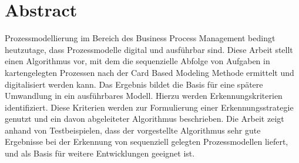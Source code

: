 

\chapter*{Abstract}
\label{cha:abstract}

Prozessmodellierung im Bereich des Business Process Management bedingt heutzutage, dass Prozessmodelle digital und ausführbar sind. Diese Arbeit stellt einen Algorithmus vor, mit dem die sequenzielle Abfolge von Aufgaben in kartengelegten Prozessen nach der Card Based Modeling Methode ermittelt und digitalisiert werden kann. Das Ergebnis bildet die Basis für eine spätere Umwandlung in ein ausführbares Modell. Hierzu werden Erkennungskriterien identifiziert. Diese Kriterien werden zur Formulierung einer Erkennungsstrategie genutzt und ein davon abgeleiteter Algorithmus beschrieben. Die Arbeit zeigt anhand von Testbeispielen, dass der vorgestellte Algorithmus sehr gute Ergebnisse bei der Erkennung von sequenziell gelegten Prozessmodellen liefert, und als Basis für weitere Entwicklungen geeignet ist.  




